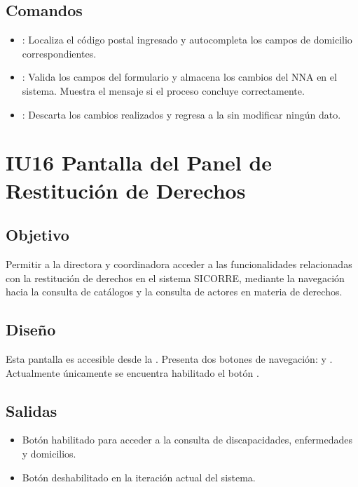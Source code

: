 \subsection{Comandos}
\begin{itemize}
	\item {}: Localiza el código postal ingresado y autocompleta 
	los campos de domicilio correspondientes.
	\item {}: Valida los campos del formulario y almacena los 
	cambios del NNA en el sistema. Muestra el mensaje 
	 si el proceso concluye 
	correctamente.
	\item {}: Descarta los cambios realizados y regresa a la 
	 sin modificar ningún dato.
\end{itemize}


\section{IU16 Pantalla del Panel de Restitución de Derechos}

\subsection{Objetivo}
Permitir a la directora y coordinadora acceder a las funcionalidades relacionadas 
con la restitución de derechos en el sistema SICORRE, mediante la navegación hacia 
la consulta de catálogos y la consulta de actores en materia de derechos.

\subsection{Diseño}
Esta pantalla  es 
accesible desde la . Presenta 
dos botones de navegación:  y 
. Actualmente únicamente se 
encuentra habilitado el botón .


\subsection{Salidas}
\begin{itemize}
	\item Botón  habilitado para acceder a la 
	consulta de discapacidades, enfermedades y domicilios.
	\item Botón  deshabilitado 
	en la iteración actual del sistema.
\end{itemize}


